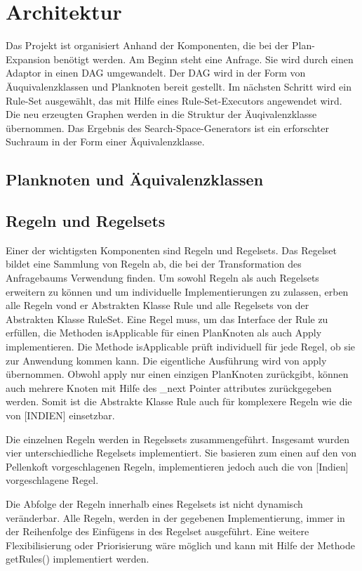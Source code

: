 \section{Architektur}

Das Projekt ist organisiert Anhand der Komponenten, die bei der Plan-Expansion benötigt werden. Am Beginn steht eine Anfrage. Sie wird durch einen Adaptor in einen DAG umgewandelt. Der DAG wird in der Form von Äuquivalenzklassen und Planknoten bereit gestellt. Im nächsten Schritt wird ein Rule-Set ausgewählt, das mit Hilfe eines Rule-Set-Executors angewendet wird. Die neu erzeugten Graphen werden in die Struktur der Äuqivalenzklasse übernommen. Das Ergebnis des Search-Space-Generators ist ein erforschter Suchraum in der Form einer Äquivalenzklasse.

\subsection{Planknoten und Äquivalenzklassen}

\subsection{Regeln und Regelsets}
Einer der wichtigsten Komponenten sind Regeln und Regelsets. Das Regelset bildet eine Sammlung von Regeln ab, die bei der Transformation des Anfragebaums Verwendung finden. Um sowohl Regeln als auch Regelsets erweitern zu können und um individuelle Implementierungen zu zulassen, erben alle Regeln vond er Abstrakten Klasse Rule und alle Regelsets von der Abstrakten Klasse RuleSet. Eine Regel muss, um das Interface der Rule zu erfüllen, die Methoden isApplicable für einen PlanKnoten als auch Apply implementieren. Die Methode isApplicable prüft individuell für jede Regel, ob sie zur Anwendung kommen kann. Die eigentliche Ausführung wird von apply übernommen. Obwohl apply nur einen einzigen PlanKnoten zurückgibt, können auch mehrere Knoten mit Hilfe des _next Pointer attributes zurückgegeben werden. Somit ist die Abstrakte Klasse Rule auch für komplexere Regeln wie die von [INDIEN] einsetzbar.

Die einzelnen Regeln werden in Regelssets zusammengeführt. Insgesamt wurden vier unterschiedliche Regelsets implementiert. Sie basieren zum einen auf den von Pellenkoft vorgeschlagenen Regeln, implementieren jedoch auch die von [Indien] vorgeschlagene Regel.

Die Abfolge der Regeln innerhalb eines Regelsets ist nicht dynamisch veränderbar. Alle Regeln, werden in der gegebenen Implementierung, immer in der Reihenfolge des Einfügens in des Regelset ausgeführt.  Eine weitere Flexibilisierung oder Priorisierung wäre möglich und kann mit Hilfe der Methode getRules() implementiert werden.

